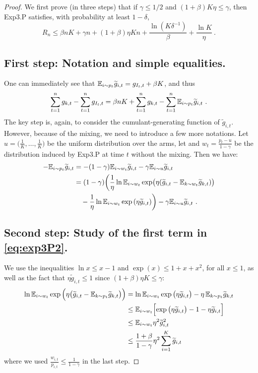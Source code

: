 \begin{proof}
We first prove (in three steps) that if $\gamma \leq 1/2$ and $(1+\beta) K \eta \leq \gamma$, then Exp3.P satisfies, with probability at least $1-\delta$,
\begin{equation} \label{eq:exp3Plem}
R_n \leq \beta n K + \gamma n + (1+\beta) \eta K n + \frac{\ln(K \delta^{-1})}{\beta} + \frac{\ln K}{\eta}~.
\end{equation}

\subsection*{First step: Notation and simple equalities.}
%
One can immediately see that $\mathbb{E}_{i \sim p_t} \widetilde{g}_{i,t} = g_{I_t,t} + \beta K$, and thus
%
\begin{equation} \label{eq:exp3P1}
\sum_{t=1}^n g_{k,t} - \sum_{t=1}^n g_{I_t,t} = \beta n K  + \sum_{t=1}^n g_{k,t} - \sum_{t=1}^n \mathbb{E}_{i \sim p_t} \widetilde{g}_{i,t}~.
\end{equation}
%
The key step is, again, to consider the cumulant-generating function of $\tilde{g}_{i,t}$. However, because of the mixing, we need to introduce a few more notations. Let $u=\bigl(\tfrac{1}{K},\hdots,\tfrac{1}{K}\bigr)$ be the uniform distribution over the arms, let and $w_t = \tfrac{p_t - u}{1-\gamma}$ be the distribution induced by Exp3.P at time $t$ without the mixing. Then we have:
\begin{align} 
- \mathbb{E}_{i \sim p_t} \widetilde{g}_{i,t} & = - (1-\gamma) \mathbb{E}_{i \sim w_t} \widetilde{g}_{i,t} - \gamma \mathbb{E}_{i \sim u} \widetilde{g}_{i,t} \notag \\
& = (1-\gamma) \biggl( \frac{1}{\eta} \ln \mathbb{E}_{i \sim w_t} \exp \bigl( \eta (\widetilde{g}_{i,t} - \mathbb{E}_{k \sim w_t} \widetilde{g}_{k,t}) \bigr) \notag \\
& \quad - \frac{1}{\eta} \ln \mathbb{E}_{i \sim w_t} \exp\left( \eta \widetilde{g}_{i,t} \right) \biggr) - \gamma \mathbb{E}_{i \sim u} \widetilde{g}_{i,t}~. \label{eq:exp3P2} 
\end{align}

\subsection*{Second step: Study of the first term in \eqref{eq:exp3P2}.}
We use the inequalities $\ln x \leq x-1$ and $\exp(x) \leq 1 + x + x^2$, for all $x \leq 1$, as well as the fact that $\eta \tilde{g}_{i,t} \leq 1$ since $(1+\beta) \eta K \leq \gamma$:
\begin{align}
\ln \mathbb{E}_{i \sim w_t} \exp{\Bigl( \eta \bigl(\widetilde{g}_{i,t} - \mathbb{E}_{k \sim p_t} \widetilde{g}_{k,t}\bigr) \Bigr)} \notag
& = \ln \mathbb{E}_{i \sim w_t} \exp{\bigl( \eta \widetilde{g}_{i,t}\bigr)} - \eta\,\mathbb{E}_{k \sim p_t} \widetilde{g}_{k,t} \notag \\
&\leq \mathbb{E}_{i \sim w_t} \Bigl[\exp{\bigl( \eta \widetilde{g}_{i,t}\bigr)} - 1 - \eta \widetilde{g}_{i,t} \Bigr] \notag \\
&\leq \mathbb{E}_{i \sim w_t} \eta^2 \widetilde{g}_{i,t}^2  \notag \\
&\leq \frac{1+\beta}{1-\gamma} \eta^2 \sum_{i=1}^K \widetilde{g}_{i,t} \label{eq:exp3P3}
\end{align}
where we used $\frac{w_{i,t}}{p_{i,t}} \leq \frac{1}{1-\gamma}$ in the last step.


\end{proof}

